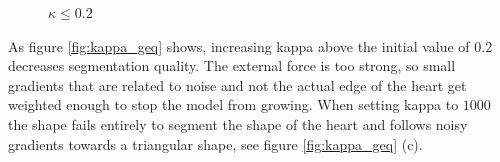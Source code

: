 \begin{figure}[!hbt]
\centering   
{}
\caption{$\kappa \leq 0.2$}
\label{fig:kappa_leq}
\end{figure}

As figure \ref{fig:kappa_geq} shows, increasing kappa above the initial value of $0.2$ decreases segmentation quality. The external force is too strong, so small gradients that are related to noise and not the actual edge of the heart get weighted enough to stop the model from growing. When setting kappa to $1000$ the shape fails entirely to segment the shape of the heart and follows noisy gradients towards a triangular shape, see figure \ref{fig:kappa_geq} (c).


